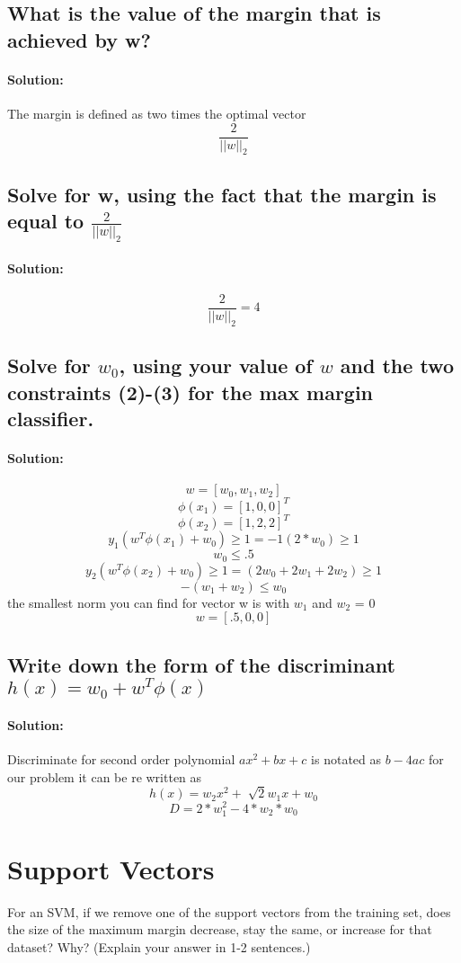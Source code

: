 \documentclass{article}
\begin{document}
\subsection{What is the value of the margin that is achieved by w?}
\paragraph{Solution:}

The margin is defined as two times the optimal vector
$$\frac{2}{||w||_2} $$
 
\subsection{Solve for w, using the fact that the margin is equal to $\frac{2}{||w||_2}$}
\paragraph{Solution:}
$$\frac{2}{||w||_2} = 4$$
\subsection{Solve for $w_0$, using your value of $w$ and the two constraints (2)-(3) for the max margin classifier.}
\paragraph{Solution:}
$$ w =[w_0,w_1,w_2] $$ 
$$\phi(x_1) = [1,0,0]^T $$
$$\phi(x_2) = [1,2,2]^T $$
$$y_1 (w^T\phi(x_1) +w_0) \geq1= -1(2*w_0) \geq1$$
$$ w_0 \leq{.5} $$ 
$$ y_2 (w^T\phi{}(x_2) +w_0)\geq1 = (2w_0+2w_1+2w_2)\geq1 $$
$$ -(w_1+w_2) \leq w_0 $$
the smallest norm you can find for vector w is with $w_1$ and $w_2$ = 0 
$$w = [.5,0,0] $$ 

\subsection{Write down the form of the discriminant $h(x) = w_0 + w^T\phi(x)$ }
\paragraph{Solution:} 
Discriminate for second order polynomial $ax^2+bx+c$ is notated as $b-4ac$
for our problem it can be re written as 
$$h(x) = w_2x^2 + \sqrt[]{2}w_1x + w_0 $$
$$D = 2*w_1^2 - 4*w_2*w_0 $$


\section{Support Vectors}
For an SVM, if we remove one of the support vectors from the training set, does the size of the maximum
margin decrease, stay the same, or increase for that dataset? Why? (Explain your answer in 1-2 sentences.)
\end{document}
